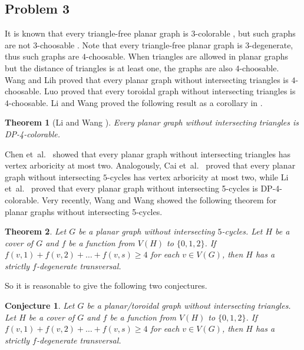 \documentclass{article}
\newtheorem{theorem}{Theorem}[section]
\newtheorem{conjecture}{Conjecture}
\theoremstyle{definition}
\newcommand{\etal}{et~al.\ }
\begin{document}
\subsection{Problem 3}
It is known that every triangle-free planar graph is $3$-colorable \cite[Gr\"{o}tzsch Theorem]{MR0116320}, but such graphs are not $3$-choosable \cite{MR1360130}. Note that every triangle-free planar graph is $3$-degenerate, thus such graphs are $4$-choosable. When triangles are allowed in planar graphs but the distance of triangles is at least one, the graphs are also $4$-choosable. Wang and Lih \cite{MR1935837} proved that every planar graph without intersecting triangles is $4$-choosable. Luo \cite{MR2292964} proved that every toroidal graph without intersecting triangles is $4$-choosable. Li and Wang proved the following result as a corollary in \cite[Corollary 1]{MR4294211}. 

\begin{theorem}[Li and Wang \cite{MR4294211}]
Every planar graph without intersecting triangles is DP-4-colorable. 
\end{theorem}

Chen \etal \cite{MR2889524} showed that every planar graph without intersecting triangles has vertex arboricity at most two. Analogously, Cai \etal \cite{MR3761240} proved that every planar graph without intersecting $5$-cycles has vertex arboricity at most two, while Li \etal \cite{Lv2019} proved that every planar graph without intersecting 5-cycles is DP-4-colorable. Very recently, Wang and Wang \cite{Wang2019+} showed the following theorem for planar graphs without intersecting 5-cycles. 

\begin{theorem}
Let $G$ be a planar graph without intersecting $5$-cycles. Let $H$ be a cover of $G$ and $f$ be a function from $V(H)$ to $\{0, 1, 2\}$. If $f(v, 1) + f(v, 2) + \dots + f(v, s) \geq 4$ for each $v \in V(G)$, then $H$ has a strictly $f$-degenerate transversal. 
\end{theorem}

So it is reasonable to give the following two conjectures. 

\begin{conjecture}
Let $G$ be a planar/toroidal graph without intersecting triangles. Let $H$ be a cover of $G$ and $f$ be a function from $V(H)$ to $\{0, 1, 2\}$. If $f(v, 1) + f(v, 2) + \dots + f(v, s) \geq 4$ for each $v \in V(G)$, then $H$ has a strictly $f$-degenerate transversal. 
\end{conjecture}
\end{document}
